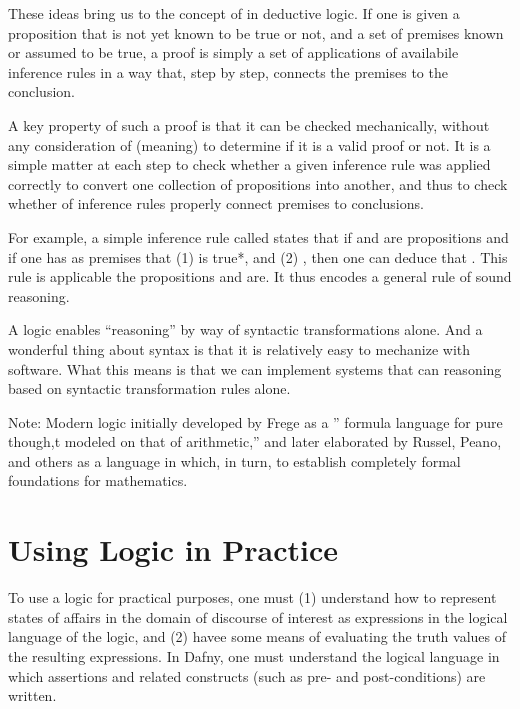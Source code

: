 \documentclass[letterpaper,10pt,english]{sphinxmanual}
\begin{document}
These ideas bring us to the concept of  in deductive logic. If
one is given a proposition that is not yet known to be true or not,
and a set of premises known or assumed to be true, a proof is simply a
set of applications of availabile inference rules in a way that, step
by step, connects the premises  to the conclusion.

A key property of such a proof is that it can be checked mechanically,
without any consideration of  (meaning) to determine if it
is a valid proof or not. It is a simple matter at each step to check
whether a given inference rule was applied correctly to convert one
collection of propositions into another, and thus to check whether
 of inference rules properly connect premises to conclusions.

For example, a simple inference rule called  states that
if  and  are propositions and if one has as premises that (1)
 is true*, and (2) , then one can
deduce that . This rule is applicable  the
propositions  and  are. It thus encodes a general rule of sound
reasoning.

A logic enables  “reasoning” by way of syntactic
transformations alone. And a wonderful thing about syntax is that it
is relatively easy to mechanize with software. What this means is that
we can implement systems that can reasoning  based on
syntactic transformation rules alone.

Note: Modern logic initially developed by Frege as a ” formula
language for pure though,t modeled on that of arithmetic,” and later
elaborated by Russel, Peano, and others as a language in which, in
turn, to establish completely formal foundations for mathematics.


\section{Using Logic in Practice}
\label{\detokenize{09-propositional-logic:using-logic-in-practice}}
To use a logic for practical purposes, one must (1) understand how to
represent states of affairs in the domain of discourse of interest as
expressions in the logical language of the logic, and (2) havee some
means of evaluating the truth values of the resulting expressions. In
Dafny, one must understand the logical language in which assertions
and related constructs (such as pre- and post-conditions) are written.
\end{document}
